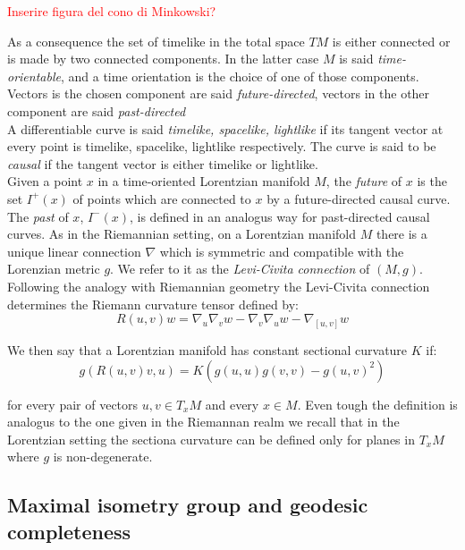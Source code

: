 \textcolor{red}{Inserire figura del cono di Minkowski?}

As a consequence the set of timelike in the total space $TM$ is either connected or is made by two connected components. In the latter case $M$ is said \textit{time-orientable}, and a time orientation is the choice of one of those components. Vectors is the chosen component are said     \textit{future-directed}, vectors in the other component are said \textit{past-directed}\\
A differentiable curve is said \textit{timelike, spacelike, lightlike} if its tangent vector at every point is timelike, spacelike, lightlike respectively. The curve is said to be \textit{causal} if the tangent vector is either timelike or lightlike. \\ Given a point $x$ in a time-oriented Lorentzian manifold $M$, the \textit{future} of $x$ is the set $I^+(x)$ of points which are connected to $x$ by a future-directed causal curve. The \textit{past} of $x$, $I^-(x)$, is defined in an analogus way for past-directed causal curves. 
As in the Riemannian setting, on a Lorentzian manifold $M$ there is a unique linear connection $\nabla$ which is symmetric and compatible with the Lorenzian metric $g$. We refer to it as the \textit{Levi-Civita connection} of $(M,g)$.\\ Following the analogy with Riemannian geometry the Levi-Civita connection determines the Riemann curvature tensor defined by: 
\[
    R(u,v)w=\nabla_u\nabla_v w-\nabla_v\nabla_u w-\nabla_{[u,v]}w
\]  

We then say that a Lorentzian manifold has constant sectional curvature $K$ if: 
\begin{equation}\label{sectionalcurvature}
    g(R(u,v)v,u)=K(g(u,u)g(v,v)-g(u,v)^2) 
\end{equation}
    


for every pair of vectors $u,v \in T_{x}M$ and every $x\in M$. Even tough the definition is analogus to the one given in the Riemannan realm we recall that in the Lorentzian setting the sectiona curvature can be defined only for planes in $T_{x}M$ where $g$ is non-degenerate. 

\subsection{Maximal isometry group and geodesic completeness} 

